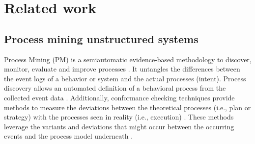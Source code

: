 \documentclass[runningheads]{llncs}
\begin{document}
\section{Related work}\label{sec:relatedwork}

\subsection{Process mining unstructured systems}
Process Mining (PM) is a semiautomatic evidence-based methodology to discover, monitor, evaluate and improve processes \cite{Aalst2012}. It untangles the differences between the event logs of a behavior or system and the actual processes (intent). Process discovery allows an automated definition of a behavioral process from the collected event data \cite{Aalst2016,Diamantini2016}. Additionally, conformance checking techniques provide methods to measure the deviations between the theoretical processes (i.e., plan or strategy) with the processes seen in reality (i.e., execution) \cite{Bergami2021}. These methods leverage the variants and deviations that might occur between the occurring events and the process model underneath \cite{Kulakli2021}.
\end{document}
